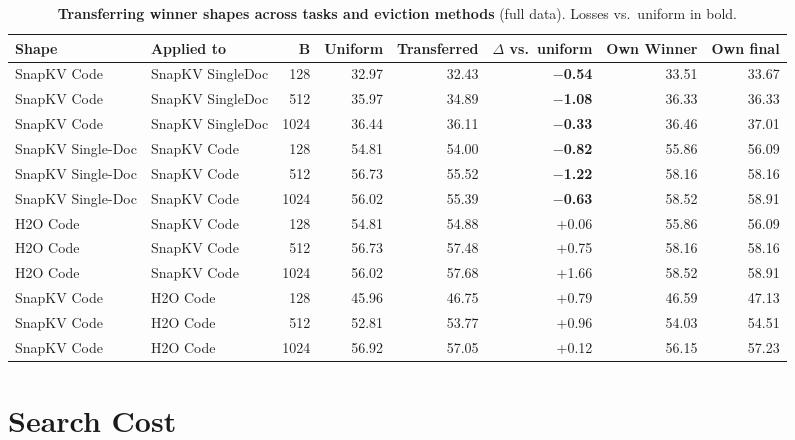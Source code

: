 \begin{table}[t]
  \centering
  \scriptsize
  \setlength{\tabcolsep}{4pt}
  \begin{tabular}{@{}l l r r r r r r@{}}
    \toprule
    Shape & Applied to & B & Uniform & Transferred & $\Delta$ vs.\ uniform & Own Winner & Own final \\
    \midrule
    SnapKV Code & SnapKV SingleDoc & 128 & 32.97 & 32.43 & \textbf{$-$0.54} & 33.51 & 33.67 \\
    SnapKV Code & SnapKV SingleDoc & 512 & 35.97 & 34.89 & \textbf{$-$1.08} & 36.33 & 36.33 \\
    SnapKV Code & SnapKV SingleDoc & 1024 & 36.44 & 36.11 & \textbf{$-$0.33} & 36.46 & 37.01 \\
    SnapKV Single-Doc & SnapKV Code & 128 & 54.81 & 54.00 & \textbf{$-$0.82} & 55.86 & 56.09 \\
    SnapKV Single-Doc & SnapKV Code & 512 & 56.73 & 55.52 & \textbf{$-$1.22} & 58.16 & 58.16 \\
    SnapKV Single-Doc & SnapKV Code & 1024 & 56.02 & 55.39 & \textbf{$-$0.63} & 58.52 & 58.91 \\
    H2O Code & SnapKV Code & 128 & 54.81 & 54.88 & +0.06 & 55.86 & 56.09 \\
    H2O Code & SnapKV Code & 512 & 56.73 & 57.48 & +0.75 & 58.16 & 58.16 \\
    H2O Code & SnapKV Code & 1024 & 56.02 & 57.68 & +1.66 & 58.52 & 58.91 \\
    SnapKV Code & H2O Code & 128 & 45.96 & 46.75 & +0.79 & 46.59 & 47.13 \\
    SnapKV Code & H2O Code & 512 & 52.81 & 53.77 & +0.96 & 54.03 & 54.51 \\
    SnapKV Code & H2O Code & 1024 & 56.92 & 57.05 & +0.12 & 56.15 & 57.23 \\
    \bottomrule
  \end{tabular}
  \caption{\textbf{Transferring winner shapes across tasks and eviction methods} (full data). Losses vs.\ uniform in bold.}
  \label{tab:app-shape-transfer}
\end{table}


\section{Search Cost}
\label{app:cost}

